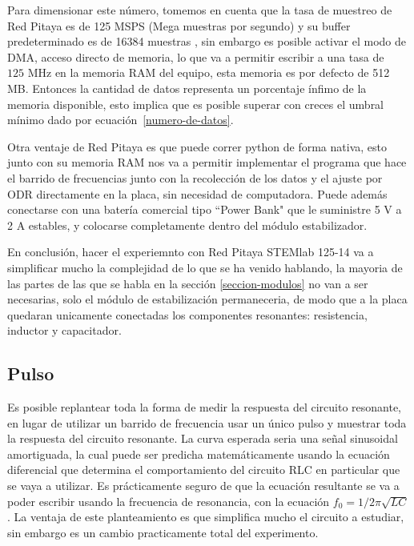 Para dimensionar este número, tomemos en cuenta que la tasa de muestreo de Red Pitaya es de 125 MSPS (Mega muestras por segundo) y su buffer predeterminado es de 16384 muestras \cite{redpitaya-datasheet}, sin embargo es posible activar el modo de DMA, acceso directo de memoria, lo que va a permitir escribir a una tasa de $125\text{ MHz}$ en la memoria RAM del equipo, esta memoria es por defecto de 512 MB. Entonces la cantidad de datos representa un porcentaje ínfimo de la memoria disponible, esto implica que es posible superar con creces el umbral mínimo dado por ecuación~\ref{numero-de-datos}.

Otra ventaje de Red Pitaya es que puede correr python de forma nativa, esto junto con su memoria RAM nos va a permitir implementar el programa que hace el barrido de frecuencias junto con la recolección de los datos y el ajuste por ODR directamente en la placa, sin necesidad de computadora. Puede además conectarse con una batería comercial tipo ``Power Bank" que le suministre 5 V a 2 A estables, y colocarse completamente dentro del módulo estabilizador. 

En conclusión, hacer el experiemnto con Red Pitaya STEMlab 125-14 va a simplificar mucho la complejidad de lo que se ha venido hablando, la mayoria de las partes de las que se habla en la sección \ref{seccion-modulos} no van a ser necesarias, solo el módulo de estabilización permaneceria, de modo que a la placa quedaran unicamente conectadas los componentes resonantes: resistencia, inductor y capacitador.

\subsection{Pulso}


Es posible replantear toda la forma de medir la respuesta del circuito resonante, en lugar de utilizar un barrido de frecuencia usar un único pulso y muestrar toda la respuesta del circuito resonante. La curva esperada seria una señal sinusoidal amortiguada, la cual puede ser predicha matemáticamente usando la ecuación diferencial que determina el comportamiento del circuito RLC en particular que se vaya a utilizar. Es prácticamente seguro de que la ecuación resultante se va a poder escribir usando la frecuencia de resonancia, con la ecuación $f_0 = 1 / 2 \pi \sqrt{LC}$. La ventaja de este planteamiento es que simplifica mucho el circuito a estudiar, sin embargo es un cambio practicamente total del experimento.


